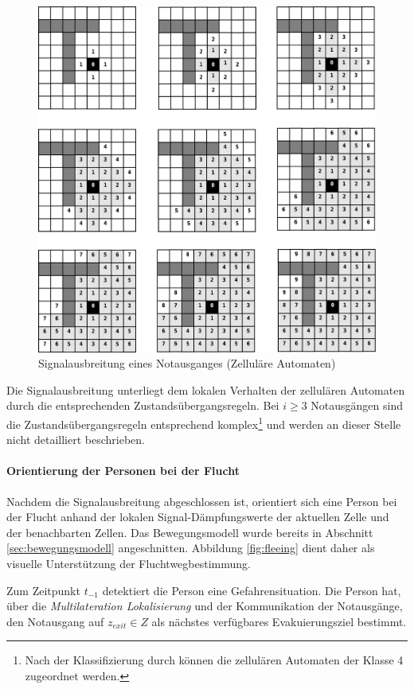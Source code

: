 \begin{figure}[!ht]
\centering
\includegraphics[height=0.9\textwidth]{algorithmik/flooding.eps}
\caption{Signalausbreitung eines Notausganges (Zelluläre Automaten)}
\label{fig:flooding}
\end{figure}

Die Signalausbreitung unterliegt dem lokalen Verhalten der zellulären Automaten durch die entsprechenden Zustandsübergangsregeln. Bei $i \geq 3$ Notausgängen sind die Zustandsübergangsregeln entsprechend komplex\footnote{Nach der Klassifizierung durch \cite{Wolfram} können die zellulären Automaten der Klasse 4 zugeordnet werden.} und werden an dieser Stelle nicht detailliert beschrieben.

\paragraph{Orientierung der Personen bei der Flucht}

Nachdem die Signalausbreitung abgeschlossen ist, orientiert sich eine Person bei der Flucht anhand der lokalen Signal-Dämpfungswerte der aktuellen Zelle und der benachbarten Zellen. Das Bewegungsmodell wurde bereits in Abschnitt \ref{sec:bewegungsmodell} angeschnitten. Abbildung \ref{fig:fleeing} dient daher als visuelle Unterstützung der Fluchtwegbestimmung.

Zum Zeitpunkt $t_{-1}$ detektiert die Person eine Gefahrensituation. Die Person hat, über die \emph{Multilateration Lokalisierung} und der Kommunikation der Notausgänge, den Notausgang auf  $z_{exit} \in Z$ als nächstes verfügbares Evakuierungsziel bestimmt.


